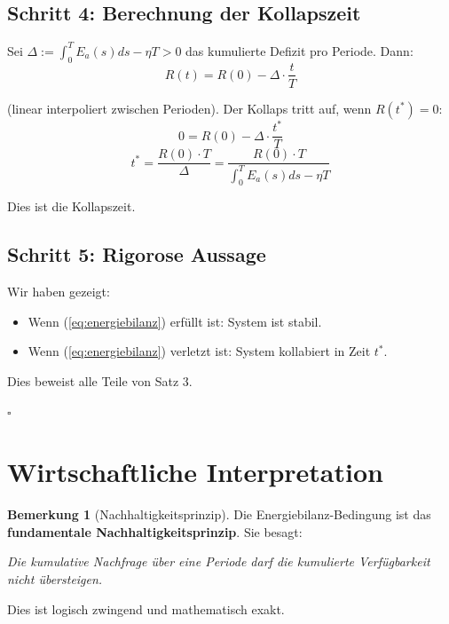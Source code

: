 \documentclass[a4paper,11pt]{report}
\theoremstyle{definition}
\newtheorem{bemerkung}{Bemerkung}[chapter]
\begin{document}
\subsection{Schritt 4: Berechnung der Kollapszeit}

Sei $\Delta := \int_0^T E_a(s) ds - \eta T > 0$ das kumulierte Defizit pro Periode. Dann:
\begin{equation}
    R(t) = R(0) - \Delta \cdot \frac{t}{T}
\end{equation}

(linear interpoliert zwischen Perioden). Der Kollaps tritt auf, wenn $R(t^*) = 0$:
\begin{equation}
    0 = R(0) - \Delta \cdot \frac{t^*}{T}
\end{equation}
\begin{equation}
    t^* = \frac{R(0) \cdot T}{\Delta} = \frac{R(0) \cdot T}{\int_0^T E_a(s) ds - \eta T}
\end{equation}

Dies ist die Kollapszeit.

\subsection{Schritt 5: Rigorose Aussage}

Wir haben gezeigt:

\begin{itemize}
    \item Wenn (\ref{eq:energiebilanz}) erfüllt ist: System ist stabil.
    \item Wenn (\ref{eq:energiebilanz}) verletzt ist: System kollabiert in Zeit $t^*$.
\end{itemize}

Dies beweist alle Teile von Satz 3.

$\square$

\section{Wirtschaftliche Interpretation}

\begin{bemerkung}[Nachhaltigkeitsprinzip]
    
    Die Energiebilanz-Bedingung ist das \textbf{fundamentale Nachhaltigkeitsprinzip}. Sie besagt:
    
    \begin{center}
        \textit{Die kumulative Nachfrage über eine Periode darf die kumulierte Verfügbarkeit nicht übersteigen.}
    \end{center}
    
    Dies ist logisch zwingend und mathematisch exakt.
\end{bemerkung}
\end{document}
